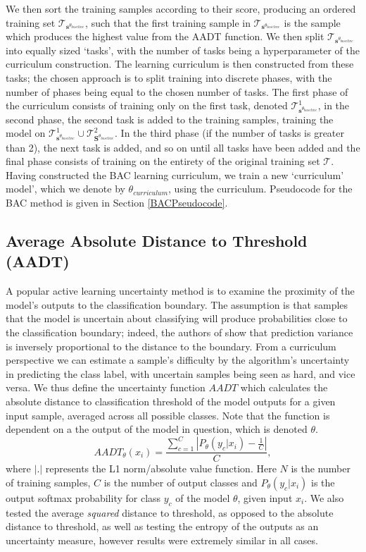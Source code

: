  We then sort the training samples according to their score, producing an ordered training set $\mathcal{T}_{\mathbf{s}^{\theta_{baseline}}}$, such that the first training sample in $\mathcal{T}_{\mathbf{s}^{\theta_{baseline}}}$ is the sample which produces the highest value from the AADT function. We then split $\mathcal{T}_{\mathbf{s}^{\theta_{baseline}}}$ into equally sized `tasks', with the number of tasks being a hyperparameter of the curriculum construction. The learning curriculum is then constructed from these tasks; the chosen approach is to split training into discrete phases, with the number of phases being equal to the chosen number of tasks. The first phase of the curriculum consists of training only on the first task, denoted $\mathcal{T}^1_{\mathbf{s}^{\theta_{baseline}}}$, in the second phase, the second task is added to the training samples, training the model on $\mathcal{T}^1_{\mathbf{s}^{\theta_{baseline}}}\cup\mathcal{T}^2_{\mathbf{S}^{\theta_{baseline}}}$. In the third phase (if the number of tasks is greater than 2), the next task is added, and so on until all tasks have been added and the final phase consists of training on the entirety of the original training set $\mathcal{T}$. Having constructed the BAC learning curriculum, we train a new `curriculum' model', which we denote by $\theta_{curriculum}$, using the curriculum. Pseudocode for the BAC method is given in Section \ref{BACPseudocode}.

\subsection{Average Absolute Distance to Threshold (AADT)}\label{BAC_AADT}
A popular active learning uncertainty method is to examine the proximity of the model's outputs to the classification boundary. The assumption is that samples that the model is uncertain about classifying will produce probabilities close to the classification boundary; indeed, the authors of \cite{Chang18} show that prediction variance is inversely proportional to the distance to the boundary. From a curriculum perspective we can estimate a sample's difficulty by the algorithm's uncertainty in predicting the class label, with uncertain samples being seen as hard, and vice versa. We thus define the uncertainty function $AADT$ which calculates the absolute distance to classification threshold of the model outputs for a given input sample, averaged across all possible classes. Note that the function is dependent on a the output of the model in question, which is denoted $\theta$.
\begin{equation}
AADT_{\theta}(x_i) = \frac{ \sum_{c=1}^{C} \left|P_{\theta}(y_c |x_i) - \frac{1}{C}\right|}{C},
\end{equation}
where $|.|$ represents the L1 norm/absolute value function.
Here $N$ is the number of training samples, $C$ is the number of output classes and $P_{\theta}(y_c |x_i)$ is the output softmax probability for class $y_c$ of the model $\theta$, given input $x_i$. We also tested the average \textit{squared} distance to threshold, as opposed to the absolute distance to threshold, as well as testing the entropy of the outputs as an uncertainty measure, however results were extremely similar in all cases.


